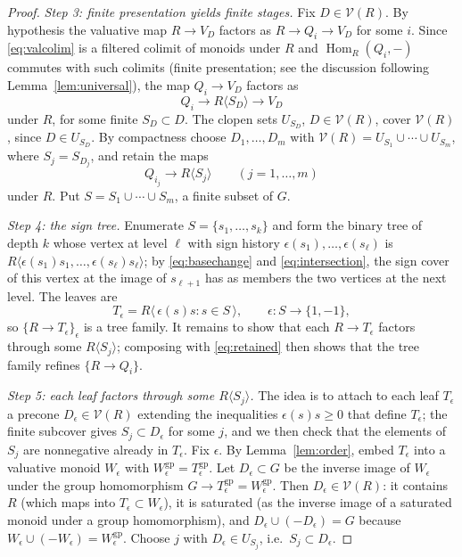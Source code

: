 \documentclass[12pt]{article}
\newcommand{\gp}{\mathrm{gp}}
\newcommand{\Hom}{\operatorname{Hom}}
\newcommand{\V}{\mathcal V}
\theoremstyle{definition}
\theoremstyle{remark}
\begin{document}
\begin{proof}
\emph{Step 3: finite presentation yields finite stages.}
Fix \(D\in\V(R)\).  By hypothesis the valuative map \(R\to V_D\) factors as
\(R\to Q_i\to V_D\) for some \(i\).  Since \eqref{eq:valcolim} is a
filtered colimit of monoids under \(R\) and \(\Hom_R(Q_i,-)\) commutes with
such colimits (finite presentation; see the discussion following
Lemma~\ref{lem:universal}), the map \(Q_i\to V_D\) factors as
\[
                       Q_i\longrightarrow R\langle S_D\rangle
                                      \longrightarrow V_D
\]
under \(R\), for some finite \(S_D\subset D\).  The clopen sets \(U_{S_D}\),
\(D\in\V(R)\), cover \(\V(R)\), since \(D\in U_{S_D}\).  By compactness choose
\(D_1,\dots,D_m\) with \(\V(R)=U_{S_1}\cup\cdots\cup U_{S_m}\), where
\(S_j=S_{D_j}\), and retain the maps
\begin{equation}
                         Q_{i_j}\longrightarrow R\langle S_j\rangle
                         \qquad(j=1,\dots,m)
                         \label{eq:retained}
\end{equation}
under \(R\).  Put \(S=S_1\cup\cdots\cup S_m\), a finite subset of \(G\).

\emph{Step 4: the sign tree.}
Enumerate \(S=\{s_1,\dots,s_k\}\) and form the binary tree of depth \(k\)
whose vertex at level \(\ell\) with sign history
\(\epsilon(s_1),\dots,\epsilon(s_\ell)\) is
\(R\langle\epsilon(s_1)s_1,\dots,\epsilon(s_\ell)s_\ell\rangle\); by
\eqref{eq:basechange} and \eqref{eq:intersection}, the sign cover of this
vertex at the image of \(s_{\ell+1}\) has as members the two vertices at the
next level.  The leaves are
\begin{equation}
      T_\epsilon
          =R\langle\,\epsilon(s)s:s\in S\,\rangle,
             \qquad \epsilon:S\longrightarrow\{1,-1\},
             \label{eq:signcover}
\end{equation}
so \(\{R\to T_\epsilon\}_\epsilon\) is a tree family.  It remains to show
that each \(R\to T_\epsilon\) factors through some
\(R\langle S_j\rangle\); composing with \eqref{eq:retained} then shows that
the tree family refines \(\{R\to Q_i\}\).

\emph{Step 5: each leaf factors through some \(R\langle S_j\rangle\).}
The idea is to attach to each leaf \(T_\epsilon\) a precone
\(D_\epsilon\in\V(R)\) extending the inequalities \(\epsilon(s)s\ge0\)
that define \(T_\epsilon\); the finite subcover gives
\(S_j\subset D_\epsilon\) for some \(j\), and we then check that the
elements of \(S_j\) are nonnegative already in \(T_\epsilon\).
Fix \(\epsilon\).  By Lemma~\ref{lem:order}, embed \(T_\epsilon\) into a
valuative monoid \(W_\epsilon\) with
\(W_\epsilon^{\gp}=T_\epsilon^{\gp}\).  Let \(D_\epsilon\subset G\) be the
inverse image of \(W_\epsilon\) under the group homomorphism
\(G\to T_\epsilon^{\gp}=W_\epsilon^{\gp}\).  Then \(D_\epsilon\in\V(R)\):
it contains \(R\) (which maps into \(T_\epsilon\subset W_\epsilon\)), it is
saturated (as the inverse image of a saturated monoid under a group
homomorphism), and \(D_\epsilon\cup(-D_\epsilon)=G\) because
\(W_\epsilon\cup(-W_\epsilon)=W_\epsilon^{\gp}\).  Choose \(j\) with
\(D_\epsilon\in U_{S_j}\), i.e.\ \(S_j\subset D_\epsilon\).


\end{proof}
\end{document}
